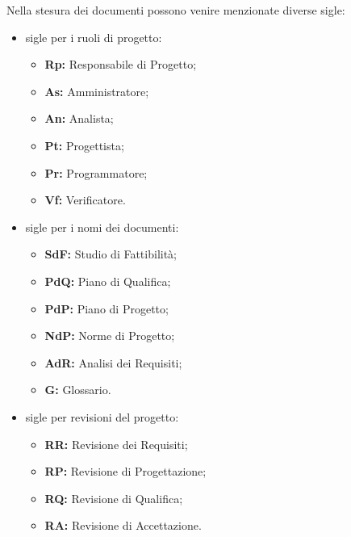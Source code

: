         Nella stesura dei documenti possono venire menzionate diverse sigle:
        \begin{itemize}
          \item sigle per i ruoli di progetto:
            \begin{itemize}
              \item \textbf{Rp:} Responsabile di Progetto;
              \item \textbf{As:} Amministratore;
              \item \textbf{An:} Analista;
              \item \textbf{Pt:} Progettista;
              \item \textbf{Pr:} Programmatore;
              \item \textbf{Vf:} Verificatore.
            \end{itemize}
          \item sigle per i nomi dei documenti:
            \begin{itemize}
              \item \textbf{SdF:} Studio di Fattibilità;
              \item \textbf{PdQ:} Piano di Qualifica;
              \item \textbf{PdP:} Piano di Progetto;
              \item \textbf{NdP:} Norme di Progetto;
              \item \textbf{AdR:} Analisi dei Requisiti;
              \item \textbf{G:} Glossario.
            \end{itemize}
          \item sigle per revisioni del progetto:
            \begin{itemize}
              \item \textbf{RR:} Revisione dei Requisiti;
              \item \textbf{RP:} Revisione di Progettazione;
              \item \textbf{RQ:} Revisione di Qualifica;
              \item \textbf{RA:} Revisione di Accettazione.
            \end{itemize}
        \end{itemize}

